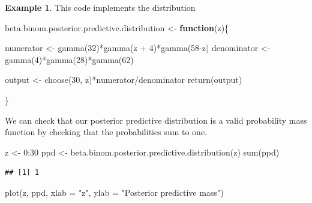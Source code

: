 \documentclass[
]{book}
\newenvironment{Shaded}{\begin{snugshade}}{\end{snugshade}}
\newcommand{\AttributeTok}[1]{\textcolor[rgb]{0.77,0.63,0.00}{#1}}
\newcommand{\ControlFlowTok}[1]{\textcolor[rgb]{0.13,0.29,0.53}{\textbf{#1}}}
\newcommand{\DecValTok}[1]{\textcolor[rgb]{0.00,0.00,0.81}{#1}}
\newcommand{\FunctionTok}[1]{\textcolor[rgb]{0.00,0.00,0.00}{#1}}
\newcommand{\NormalTok}[1]{#1}
\newcommand{\OtherTok}[1]{\textcolor[rgb]{0.56,0.35,0.01}{#1}}
\newcommand{\SpecialCharTok}[1]{\textcolor[rgb]{0.00,0.00,0.00}{#1}}
\newcommand{\StringTok}[1]{\textcolor[rgb]{0.31,0.60,0.02}{#1}}
\theoremstyle{definition}
\theoremstyle{definition}
\newtheorem{example}{Example}[chapter]
\theoremstyle{definition}
\theoremstyle{definition}
\theoremstyle{remark}
\begin{document}
\begin{example}
This code implements the distribution

\begin{Shaded}
\begin{Highlighting}[]
\NormalTok{beta.binom.posterior.predictive.distribution }\OtherTok{\textless{}{-}} \ControlFlowTok{function}\NormalTok{(z)\{}
  
  
\NormalTok{  numerator }\OtherTok{\textless{}{-}} \FunctionTok{gamma}\NormalTok{(}\DecValTok{32}\NormalTok{)}\SpecialCharTok{*}\FunctionTok{gamma}\NormalTok{(z }\SpecialCharTok{+} \DecValTok{4}\NormalTok{)}\SpecialCharTok{*}\FunctionTok{gamma}\NormalTok{(}\DecValTok{58}\SpecialCharTok{{-}}\NormalTok{z)}
\NormalTok{  denominator }\OtherTok{\textless{}{-}} \FunctionTok{gamma}\NormalTok{(}\DecValTok{4}\NormalTok{)}\SpecialCharTok{*}\FunctionTok{gamma}\NormalTok{(}\DecValTok{28}\NormalTok{)}\SpecialCharTok{*}\FunctionTok{gamma}\NormalTok{(}\DecValTok{62}\NormalTok{)}
  
\NormalTok{  output }\OtherTok{\textless{}{-}} \FunctionTok{choose}\NormalTok{(}\DecValTok{30}\NormalTok{, z)}\SpecialCharTok{*}\NormalTok{numerator}\SpecialCharTok{/}\NormalTok{denominator}
  \FunctionTok{return}\NormalTok{(output)}
  
\NormalTok{\}}
\end{Highlighting}
\end{Shaded}

We can check that our posterior predictive distribution is a valid probability mass function by checking that the probabilities sum to one.

\begin{Shaded}
\begin{Highlighting}[]
\NormalTok{z }\OtherTok{\textless{}{-}} \DecValTok{0}\SpecialCharTok{:}\DecValTok{30}
\NormalTok{ppd }\OtherTok{\textless{}{-}} \FunctionTok{beta.binom.posterior.predictive.distribution}\NormalTok{(z)}
\FunctionTok{sum}\NormalTok{(ppd)}
\end{Highlighting}
\end{Shaded}

\begin{verbatim}
## [1] 1
\end{verbatim}

\begin{Shaded}
\begin{Highlighting}[]
\FunctionTok{plot}\NormalTok{(z, ppd, }\AttributeTok{xlab =} \StringTok{"z"}\NormalTok{, }\AttributeTok{ylab =} \StringTok{"Posterior predictive mass"}\NormalTok{)}
\end{Highlighting}
\end{Shaded}


\end{example}
\end{document}
